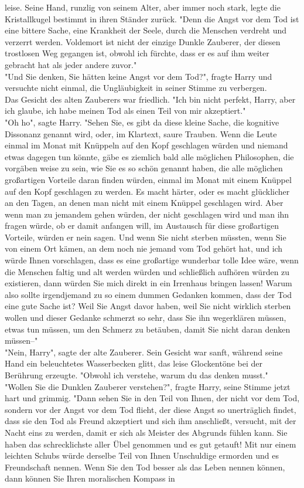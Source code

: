 {leise. Seine Hand, runzlig von seinem Alter, aber immer noch stark, legte die Kristallkugel bestimmt in ihren Ständer zurück. "Denn die Angst vor dem Tod ist eine bittere Sache, eine Krankheit der Seele, durch die Menschen verdreht und verzerrt werden. Voldemort ist nicht der einzige Dunkle Zauberer, der diesen trostlosen Weg gegangen ist, obwohl ich fürchte, dass er es auf ihm weiter gebracht hat als jeder andere zuvor."\\ "Und Sie denken, Sie hätten keine Angst vor dem Tod?", fragte Harry und versuchte nicht einmal, die Ungläubigkeit in seiner Stimme zu verbergen.\\ Das Gesicht des alten Zauberers war friedlich. "Ich bin nicht perfekt, Harry, aber ich glaube, ich habe meinen Tod als einen Teil von mir akzeptiert."\\ "Oh ho", sagte Harry. "Sehen Sie, es gibt da diese kleine Sache, die kognitive Dissonanz genannt wird, oder, im Klartext, saure Trauben. Wenn die Leute einmal im Monat mit Knüppeln auf den Kopf geschlagen würden und niemand etwas dagegen tun könnte, gäbe es ziemlich bald alle möglichen Philosophen, die vorgäben weise zu sein, wie Sie es so schön genannt haben, die alle möglichen großartigen Vorteile daran finden würden, einmal im Monat mit einem Knüppel auf den Kopf geschlagen zu werden. Es macht härter, oder es macht glücklicher an den Tagen, an denen man nicht mit einem Knüppel geschlagen wird. Aber wenn man zu jemandem gehen würden, der nicht geschlagen wird und man ihn fragen würde, ob er damit anfangen will, im Austausch für diese großartigen Vorteile, würden er nein sagen. Und wenn Sie nicht sterben müssten, wenn Sie von einem Ort kämen, an dem noch nie jemand vom Tod gehört hat, und ich würde Ihnen vorschlagen, dass es eine großartige wunderbar tolle Idee wäre, wenn die Menschen faltig und alt werden würden und schließlich aufhören würden zu existieren, dann würden Sie mich direkt in ein Irrenhaus bringen lassen! Warum also sollte irgendjemand zu so einem dummen Gedanken kommen, dass der Tod eine gute Sache ist? Weil Sie Angst davor haben, weil Sie nicht wirklich sterben wollen und dieser Gedanke schmerzt so sehr, dass Sie ihn wegerklären müssen, etwas tun müssen, um den Schmerz zu betäuben, damit Sie nicht daran denken müssen--"\\ "Nein, Harry", sagte der alte Zauberer. Sein Gesicht war sanft, während seine Hand ein beleuchtetes Wasserbecken glitt, das leise Glockentöne bei der Berührung erzeugte. "Obwohl ich verstehe, warum du das denken musst."\\ "Wollen Sie die Dunklen Zauberer verstehen?", fragte Harry, seine Stimme jetzt hart und grimmig. "Dann sehen Sie in den Teil von Ihnen, der nicht vor dem Tod, sondern vor der Angst vor dem Tod flieht, der diese Angst so unerträglich findet, dass sie den Tod als Freund akzeptiert und sich ihm anschließt, versucht, mit der Nacht eins zu werden, damit er sich als Meister des Abgrunds fühlen kann. Sie haben das schrecklichste aller Übel genommen und es gut getauft! Mit nur einem leichten Schubs würde derselbe Teil von Ihnen Unschuldige ermorden und es Freundschaft nennen. Wenn Sie den Tod besser als das Leben nennen können, dann können Sie Ihren moralischen Kompass in }
